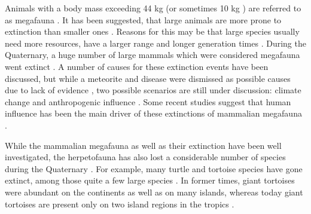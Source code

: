 Animals with a body mass exceeding 44 kg (or sometimes 10 kg \citep{Sandom2014}) are referred to as megafauna \citep{Barnosky2004, Rhodin2015}.
It has been suggested, that large animals are more prone to extinction than smaller ones \citep{.}. Reasons for this may be that large species usually need more resources, have a larger range and longer generation times \citep{.}. 
During the Quaternary, a huge number of large mammals which were considered megafauna went extinct \citep{.}.
A number of causes for these extinction events have been discussed, but while a meteorite and disease were dismissed as possible causes due to lack of evidence \citep{.}, two possible scenarios are still under discussion: climate change and anthropogenic influence \citep{.}.
Some recent studies suggest that human influence has been the main driver of these extinctions of mammalian megafauna \citep{Barnosky2004,Sandom2014,Gibbons2004,Schuster2000}.


While the mammalian megafauna as well as their extinction %
have been well investigated, the herpetofauna has also lost a considerable number of species during the Quaternary \citep{Blain2016}. 
For example, many turtle and tortoise species have gone extinct, among those quite a few large species \cite{Rhodin2015}.
In former times, giant tortoises were abundant on the continents as well as on many islands, whereas today giant tortoises are present only on two island regions in the tropics \citep{.}
.




